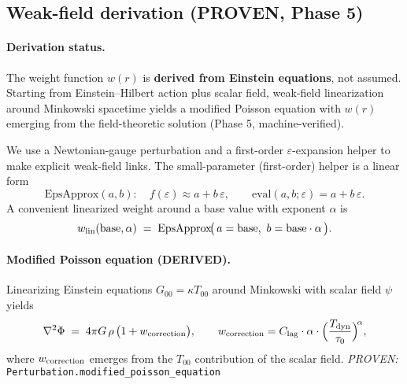 \documentclass[12pt,a4paper]{article}
\begin{document}
\subsection{Weak-field derivation (PROVEN, Phase 5)}
\paragraph{Derivation status.} The weight function \(w(r)\) is \textbf{derived from Einstein equations}, not assumed. Starting from Einstein–Hilbert action plus scalar field, weak-field linearization around Minkowski spacetime yields a modified Poisson equation with \(w(r)\) emerging from the field-theoretic solution (Phase 5, machine-verified).

We use a Newtonian-gauge perturbation and a first-order \(\varepsilon\)-expansion helper to make explicit weak-field links. The small-parameter (first-order) helper is a linear form
\begin{equation}
  \text{EpsApprox}(a,b):\quad f(\varepsilon)\approx a + b\,\varepsilon,\qquad
  \mathrm{eval}(a,b;\varepsilon)=a+b\,\varepsilon.
  \label{eq:epsapprox}
\end{equation}
A convenient linearized weight around a base value with exponent \(\alpha\) is
\begin{equation}
  w_{\rm lin}(\text{base},\alpha)\;=\;\mathrm{EpsApprox}\!\bigl(\,a=\text{base},\ b=\text{base}\cdot\alpha\,\bigr).
  \label{eq:wlin}
\end{equation}

\paragraph{Modified Poisson equation (DERIVED).}
Linearizing Einstein equations \(G_{00} = \kappa T_{00}\) around Minkowski with scalar field \(\psi\) yields
\begin{equation}
  \nabla^2\Phi \;=\; 4\pi G\,\rho\,\bigl(1 + w_{\rm correction}\bigr),
  \qquad w_{\rm correction} = C_{\rm lag}\cdot\alpha\cdot\Bigl(\frac{T_{\rm dyn}}{\tau_0}\Bigr)^{\!\alpha},
  \label{eq:modified-poisson-derived}
\end{equation}
where \(w_{\rm correction}\) emerges from the \(T_{00}\) contribution of the scalar field.
\hfill\emph{PROVEN:} \texttt{Perturbation.modified\_poisson\_equation}
\end{document}
